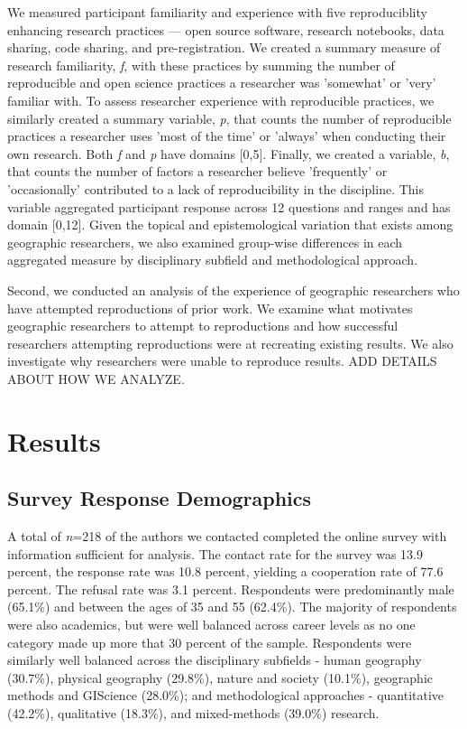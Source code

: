 \documentclass[]{interact}
\theoremstyle{plain}%
\theoremstyle{definition}
\theoremstyle{remark}
\begin{document}
We measured participant familiarity and experience with five reproduciblity enhancing research practices --- open source software, research notebooks, data sharing, code sharing, and pre-registration. 
We created a summary measure of research familiarity, \textit{f}, with these practices by summing the number of reproducible and open science practices a researcher was 'somewhat' or 'very' familiar with.
To assess researcher experience with reproducible practices, we similarly created a summary variable, \textit{p}, that counts the number of reproducible practices a researcher uses 'most of the time' or 'always' when conducting their own research. 
Both \textit{f} and \textit{p} have domains [0,5]. 
Finally, we created a variable, \textit{b}, that counts the number of factors a researcher believe 'frequently' or 'occasionally' contributed to a lack of reproducibility in the discipline. 
This variable aggregated participant response across 12 questions and ranges and has domain [0,12].
Given the topical and epistemological variation that exists among geographic researchers, we also examined group-wise differences in each aggregated measure by disciplinary subfield and methodological approach.

Second, we conducted an analysis of the experience of geographic researchers who have attempted reproductions of prior work. 
We examine what motivates geographic researchers to attempt to reproductions and how successful researchers attempting reproductions were at recreating existing results. 
We also investigate why researchers were unable to reproduce results.
ADD DETAILS ABOUT HOW WE ANALYZE.



\section*{Results}

\subsection*{Survey Response Demographics}
A total of \textit{n}=218 of the authors we contacted completed the online survey with information sufficient for analysis. 
The contact rate for the survey was 13.9 percent, the response rate was 10.8 percent, yielding a cooperation rate of 77.6 percent. 
The refusal rate was 3.1 percent.
Respondents were predominantly male (65.1\%) and between the ages of 35 and 55 (62.4\%). 
The majority of respondents were also academics, but were well balanced across career levels as no one category made up more that 30 percent of the sample.
Respondents were similarly well balanced across the disciplinary subfields - human geography (30.7\%), physical geography (29.8\%), nature and society (10.1\%), geographic methods and GIScience (28.0\%); and methodological approaches - quantitative (42.2\%), qualitative (18.3\%), and mixed-methods (39.0\%) research.
\end{document}
